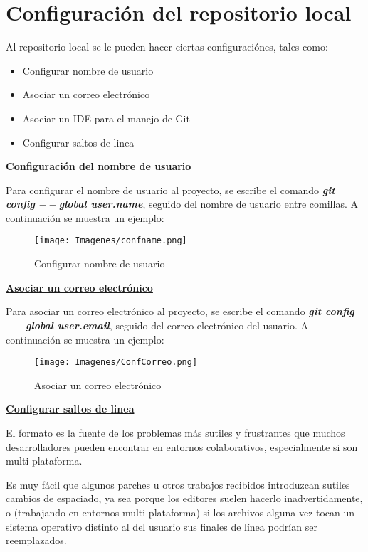 \section{Configuración del repositorio local}

Al repositorio local se le pueden hacer ciertas configuraciónes, tales como:

\begin{itemize}
    \item Configurar nombre de usuario
    \item Asociar un correo electrónico
    \item Asociar un IDE para el manejo de Git
    \item Configurar saltos de linea
    
\end{itemize}

\textbf{\underline{Configuración del nombre de usuario}}

Para configurar el nombre de usuario al proyecto, se escribe el comando \textit{\textbf{git config $--$global user.name}}, seguido del nombre de usuario entre comillas. A continuación se muestra un ejemplo:
        
    \begin{figure}[H]
        \centering
        \texttt{[image: Imagenes/confname.png]}
        \caption{Configurar nombre de usuario}
        \label{}
    \end{figure}

\textbf{\underline{Asociar un correo electrónico}}

Para asociar un correo electrónico al proyecto, se escribe el comando \textit{\textbf{git config $--$global user.email}}, seguido del correo electrónico del usuario. A continuación se muestra un ejemplo:
        
    \begin{figure}[H]
        \centering
        \texttt{[image: Imagenes/ConfCorreo.png]}
        \caption{Asociar un correo electrónico}
        \label{}
    \end{figure}

\textbf{\underline{Configurar saltos de linea}}

El formato es la fuente de los problemas más sutiles y frustrantes que muchos desarrolladores pueden encontrar en entornos colaborativos, especialmente si son multi-plataforma.

Es muy fácil que algunos parches u otros trabajos recibidos introduzcan sutiles cambios de espaciado, ya sea porque los editores suelen hacerlo inadvertidamente, o (trabajando en entornos multi-plataforma) si los archivos alguna vez tocan un sistema operativo distinto al del usuario sus finales de línea podrían ser reemplazados.

